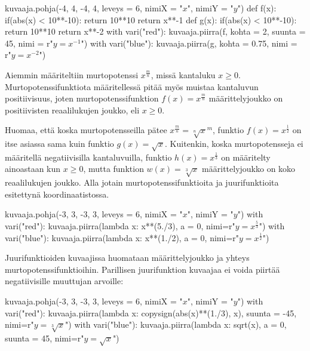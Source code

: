 \begin{center}
\begin{kuva}
    kuvaaja.pohja(-4, 4, -4, 4, leveys = 6, nimiX = "$x$", nimiY = "$y$")
    def f(x):
      if(abs(x) < 10**-10): return 10**10
      return x**-1
    def g(x):
      if(abs(x) < 10**-10): return 10**10
      return x**-2
    with vari("red"): kuvaaja.piirra(f, kohta = 2, suunta = 45, nimi = r"$y=x^{-1}$")
    with vari("blue"): kuvaaja.piirra(g, kohta = 0.75, nimi = r"$y=x^{-2}$")
\end{kuva}
\end{center}

Aiemmin määriteltiin murtopotenssi $x^{\frac{m}{n}}$, missä kantaluku $x\geq0$. Murtopotenssifunktiota määritellessä pitää myös muistaa kantaluvun positiivisuus, joten murtopotenssifunktion $f(x)=x^{\frac{m}{n}}$ määrittelyjoukko on positiivisten reaalilukujen joukko, eli $x\geq0$.

Huomaa, että koska murtopotensseilla pätee $x^{\frac{m}{n}}={\sqrt[n]{x}}^m$, funktio $f(x)=x^{\frac{1}{2}}$ on itse asiassa sama kuin funktio $g(x)=\sqrt{x}$. Kuitenkin, koska murtopotensseja ei määritellä negatiivisilla kantaluvuilla, funktio $h(x)=x^{\frac{1}{3}}$ on määritelty ainoastaan kun $x\geq0$, mutta funktion $w(x)=\sqrt[3]{x}$ määrittelyjoukko on koko reaalilukujen joukko. Alla jotain murtopotenssifunktioita ja juurifunktioita esitettynä koordinaatistossa.

\begin{center}
\begin{kuva}
    kuvaaja.pohja(-3, 3, -3, 3, leveys = 6, nimiX = "$x$", nimiY = "$y$")
    with vari("red"): kuvaaja.piirra(lambda x: x**(5./3), a = 0, nimi=r"$y=x^\frac{5}{3}$")
    with vari("blue"): kuvaaja.piirra(lambda x: x**(1./2), a = 0, nimi=r"$y=x^\frac{1}{2}$")
\end{kuva}
\end{center}

Juurifunktioiden kuvaajissa huomataan määrittelyjoukko ja yhteys murtopotenssifunktioihin. Parillisen juurifunktion kuvaajaa ei voida piirtää negatiivisille muuttujan arvoille:

\begin{center}
\begin{kuva}
    kuvaaja.pohja(-3, 3, -3, 3, leveys = 6, nimiX = "$x$", nimiY = "$y$")
    with vari("red"): kuvaaja.piirra(lambda x: copysign(abs(x)**(1./3), x), suunta = -45, nimi=r"$y=\sqrt[3]{x}$")
    with vari("blue"): kuvaaja.piirra(lambda x: sqrt(x), a = 0, suunta = 45, nimi=r"$y=\sqrt{x}$")
\end{kuva}
\end{center}

